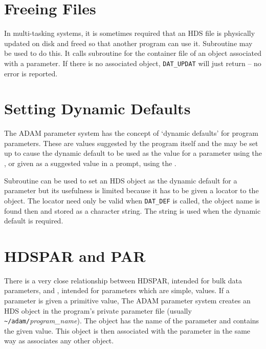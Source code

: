 \documentclass[twoside,11pt,nolof]{starlink}
\begin{document}
\section{Freeing Files}
In multi-tasking systems, it is sometimes required that an HDS file is
physically updated on disk and freed so that another program can use it.
Subroutine
may be used to do this. It calls subroutine
for the container file of an object associated with a parameter.
If there is no associated object, \texttt{DAT\_UPDAT} will just return
-- no error is reported.

\section{Setting Dynamic Defaults}
The ADAM parameter system has the concept of `dynamic defaults' for program
parameters. These are values suggested by the program itself and the
may be set up to cause the dynamic default to be used as the value for a
parameter using the
,
or given as a suggested value in a prompt, using the
.

Subroutine
can be used to set an HDS object as the dynamic default for a parameter but its
usefulness is limited because it has to be given a locator to the object.
The locator need only be valid when \texttt{DAT\_DEF} is called, the object
name is found then and stored as a character string.
The string is used when the dynamic default is required.

\section{HDSPAR and PAR}
There is a very close relationship between
HDSPAR, intended for bulk data parameters, and
,
intended for parameters which are simple,
values.
If a parameter is given a primitive value, The ADAM parameter system creates
an HDS object in the program's private parameter file (usually
\verb!~/adam/!\textit{program\_name}).
The object has the name of the parameter and contains the given value.
This object is then associated with the parameter in the same way as
associates any other object.
\end{document}
